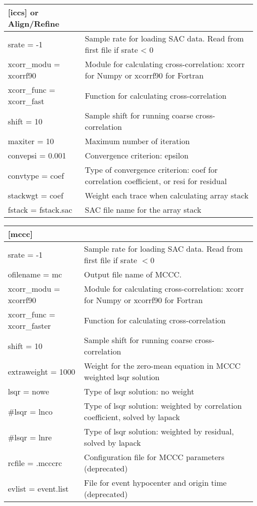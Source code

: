 \documentclass[letterpaper,10pt,english]{sphinxmanual}
\begin{document}
\begin{tabulary}{\linewidth}{|L|L|}
\hline
\textsf{\relax 
{[}iccs{]} or Align/Refine
} & \textsf{\relax }\\
\hline
srate = -1
 & 
Sample rate for loading SAC data. Read from first file if srate \textless{} 0
\\
\hline
xcorr\_modu = xcorrf90
 & 
Module for calculating cross-correlation:
xcorr for Numpy or xcorrf90 for Fortran
\\
\hline
xcorr\_func = xcorr\_fast
 & 
Function for calculating cross-correlation
\\
\hline
shift = 10
 & 
Sample shift for running coarse cross-correlation
\\
\hline
maxiter = 10
 & 
Maximum number of iteration
\\
\hline
convepsi = 0.001
 & 
Convergence criterion: epsilon
\\
\hline
convtype = coef
 & 
Type of convergence criterion: coef for correlation coefficient,
or resi for residual
\\
\hline
stackwgt = coef
 & 
Weight each trace when calculating array stack
\\
\hline
fstack = fstack.sac
 & 
SAC file name for the array stack
\\
\hline\end{tabulary}


\begin{tabulary}{\linewidth}{|L|L|}
\hline
\textsf{\relax 
{[}mccc{]}
} & \textsf{\relax }\\
\hline
srate = -1
 & 
Sample rate for loading SAC data.
Read from first file if srate \(< 0\)
\\
\hline
ofilename = mc
 & 
Output file name of MCCC.
\\
\hline
xcorr\_modu = xcorrf90
 & 
Module for calculating cross-correlation:
xcorr for Numpy or xcorrf90 for Fortran
\\
\hline
xcorr\_func = xcorr\_faster
 & 
Function for calculating cross-correlation
\\
\hline
shift = 10
 & 
Sample shift for running coarse cross-correlation
\\
\hline
extraweight = 1000
 & 
Weight for the zero-mean equation in MCCC weighted lsqr solution
\\
\hline
lsqr = nowe
 & 
Type of lsqr solution: no weight
\\
\hline
\#lsqr = lnco
 & 
Type of lsqr solution: weighted by correlation coefficient,
solved by lapack
\\
\hline
\#lsqr = lnre
 & 
Type of lsqr solution: weighted by residual, solved by lapack
\\
\hline
rcfile = .mcccrc
 & 
Configuration file for MCCC parameters (deprecated)
\\
\hline
evlist = event.list
 & 
File for event hypocenter and origin time (deprecated)
\\
\hline\end{tabulary}
\end{document}
